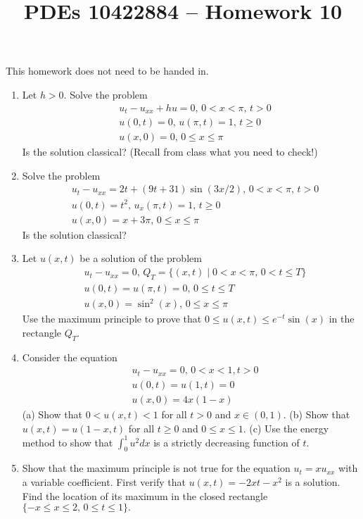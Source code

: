 \documentclass[10pt,a4paper]{article}
\title{PDEs 10422884 – Homework 10}
\date{}
\begin{document}
\maketitle


This homework does not need to be handed in. 
\begin{enumerate}
\item Let $h>0.$ Solve the problem
\begin{align*}
& u_t - u_{xx} + hu = 0, \, 0 < x < \pi, \, t > 0 \\
& u(0,t) = 0, \, u(\pi,t) = 1, \, t \geq 0 \\
& u(x,0) = 0, \, 0 \leq x \leq \pi
\end{align*}
Is the solution classical? (Recall from class what you need to check!)
\item  Solve the problem
\begin{align*}
& u_t - u_{xx} = 2t + (9t + 31) \sin(3x/2), \, 0 < x < \pi, \, t > 0 \\
& u(0,t) = t^2, \, u_x(\pi,t) = 1, \, t \geq 0 \\
& u(x,0) = x+3\pi, \, 0 \leq x \leq \pi
\end{align*}
Is the solution classical?
\item Let $u(x,t)$ be a solution of the problem
\begin{align*}
& u_t - u_{xx} = 0, \, Q_T = \{ (x,t) \mid 0 < x < \pi, \, 0 < t \leq T \} \\
& u(0,t) =  u(\pi,t) = 0, \, 0\leq t \leq T \\
& u(x,0) = \sin^2(x), \, 0 \leq x \leq \pi
\end{align*}
Use the maximum principle to prove that $0 \leq u(x,t) \leq e^{-t} \sin(x)$ in the rectangle $Q_T.$
\item Consider the equation 
\begin{align*}
& u_t - u_{xx} = 0, \, 0 < x < 1, t > 0\\
& u(0,t) = u(1,t) = 0 \\
& u(x,0) = 4x(1-x)
\end{align*}
(a) Show that $0 < u(x,t) < 1$ for all $t>0$ and $x \in (0,1).$ (b) Show that $u(x,t) = u(1-x,t)$ for all $t \geq 0$ and $0 \leq x \leq 1.$ (c) Use the energy method to show that $\int_0^1 u^2 dx$ is a strictly decreasing function of $t.$
\item Show that the maximum principle is not true for the equation $u_t = xu_{xx}$ with a variable coefficient. First verify that $u(x,t) = -2xt - x^2$ is a solution. Find the location of its maximum in the closed rectangle $\{-x \leq x \leq 2, \, 0 \leq t \leq 1\}.$
 \end{enumerate}
\end{document}
